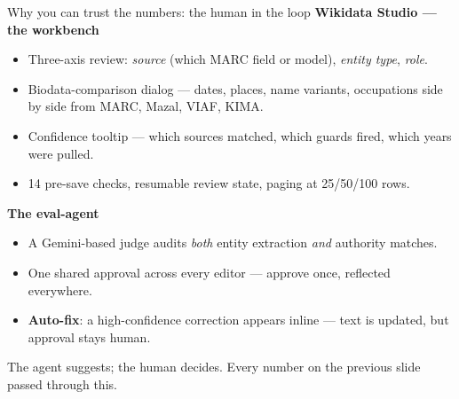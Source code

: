 \documentclass[aspectratio=169,12pt]{beamer}
\begin{document}
\begin{frame}[t]{Why you can trust the numbers: the human in the loop}
  \textbf{Wikidata Studio --- the workbench}
  \begin{itemize}
    \item Three-axis review: \emph{source} (which MARC field or model), \emph{entity type}, \emph{role}.
    \item Biodata-comparison dialog --- dates, places, name variants, occupations side by side from MARC, Mazal, VIAF, KIMA.
    \item Confidence tooltip --- which sources matched, which guards fired, which years were pulled.
    \item 14 pre-save checks, resumable review state, paging at 25/50/100 rows.
  \end{itemize}
  \textbf{The eval-agent}
  \begin{itemize}
    \item A Gemini-based judge audits \emph{both} entity extraction \emph{and} authority matches.
    \item One shared approval across every editor --- approve once, reflected everywhere.
    \item \textbf{Auto-fix}: a high-confidence correction appears inline --- text is updated, but approval stays human.
  \end{itemize}
  \vfill
  {\footnotesize The agent suggests; the human decides. Every number on the previous slide passed through this.}
\end{frame}
\end{document}
